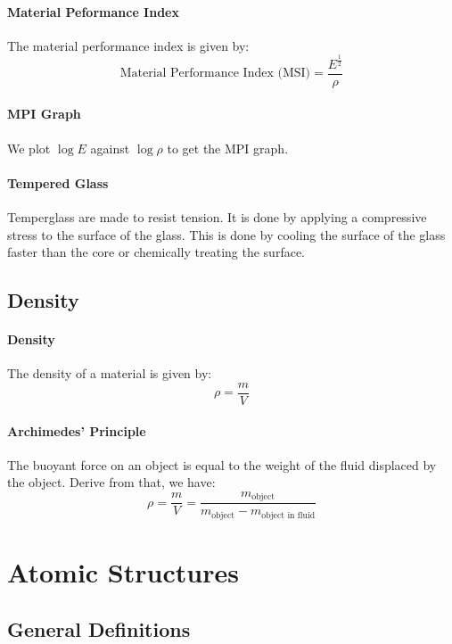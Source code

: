 \documentclass[11pt]{report}
\begin{document}
\paragraph{Material Peformance Index} The material performance index is given by:
    \begin{equation}
        \text{Material Performance Index (MSI)} = \frac{E^\frac{1}{2}}{\rho}
\end{equation}
\paragraph{MPI Graph} We plot $\log E$ against $\log \rho$ to get the MPI graph. 
\paragraph{Tempered Glass} Temperglass are made to resist tension. It is done by applying a compressive stress to the surface of the glass. This is done by cooling the surface of the glass faster than the core or chemically treating the surface.
\subsection{Density}
\paragraph{Density} The density of a material is given by:
\begin{equation}
    \rho = \frac{m}{V}
\end{equation}
\paragraph{Archimedes' Principle} The buoyant force on an object is equal to the weight of the fluid displaced by the object. Derive from that, we have:
\begin{equation}
    \rho = \frac{m}{V} = \frac{m_{\text{object}}}{m_{\text{object}} - m_{\text{object in fluid}}}
\end{equation}
\section{Atomic Structures}
\subsection{General Definitions}
\end{document}
